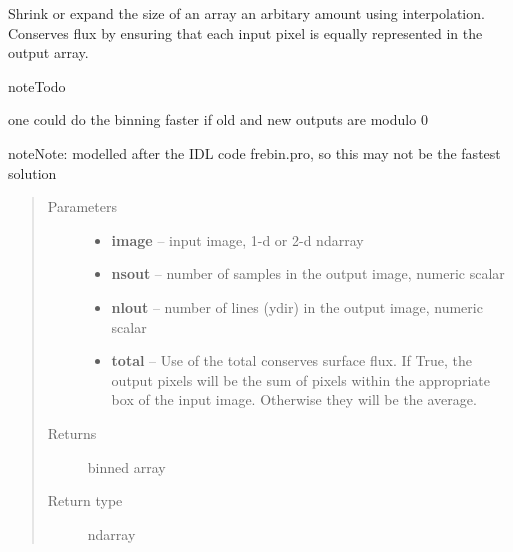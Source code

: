\documentclass[a4paper,11pt,english]{sphinxmanual}
\begin{document}
\begin{fulllineitems}
\label{support:support.imageManipulation.frebin}
Shrink or expand the size of an array an arbitary amount using interpolation.
Conserves flux by ensuring that each input pixel is equally represented
in the output array.

\begin{notice}{note}{Todo}

one could do the binning faster if old and new outputs are modulo 0
\end{notice}

\begin{notice}{note}{Note:}
modelled after the IDL code frebin.pro, so this may not be the fastest solution
\end{notice}
\begin{quote}\begin{description}
\item[{Parameters}] \leavevmode\begin{itemize}
\item {} 
\textbf{image} -- input image, 1-d or 2-d ndarray

\item {} 
\textbf{nsout} -- number of samples in the output image, numeric scalar

\item {} 
\textbf{nlout} -- number of lines (ydir) in the output image, numeric scalar

\item {} 
\textbf{total} -- Use of the total conserves surface flux. If True, the output pixels
will be the sum of pixels within the appropriate box of the input image.
Otherwise they will be the average.

\end{itemize}

\item[{Returns}] \leavevmode
binned array

\item[{Return type}] \leavevmode
ndarray

\end{description}\end{quote}

\end{fulllineitems}

\end{document}
